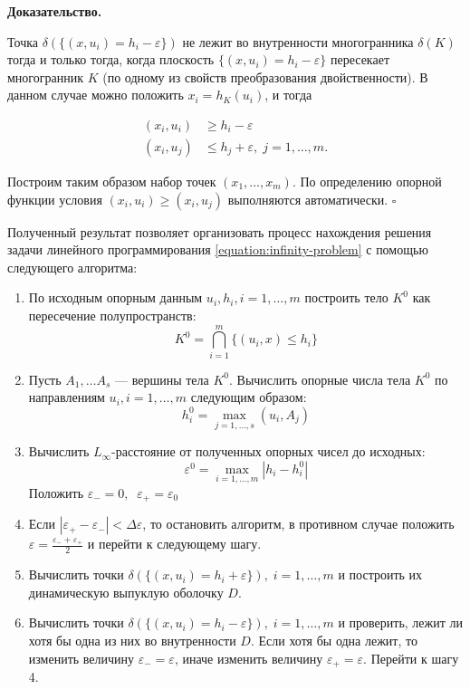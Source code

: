 \documentclass[a4paper, 10pt]{article}
\theoremstyle{definition}
\theoremstyle{plain}
\theoremstyle{plain}
\begin{document}
\textbf{Доказательство.}

Точка $\delta(\{(x, u_{i}) = h_{i} - \varepsilon\})$ не лежит во внутренности
многогранника $\delta(K)$ тогда и только тогда, когда плоскость
$\{(x, u_{i}) = h_{i} - \varepsilon\}$ пересекает многогранник $K$ (по
одному из свойств преобразования двойственности). В данном случае можно положить
$ x_{i} = h_{K}(u_{i}) $, и тогда 

\begin{align*}
 (x_{i}, u_{i}) & \geq h_{i} - \varepsilon \\
 (x_{i}, u_{j}) & \leq h_{j} + \varepsilon, \; j = 1, \ldots, m.
\end{align*}

Построим таким образом набор точек $(x_{1}, \ldots, x_{m})$. По определению
опорной функции условия $(x_{i}, u_{i}) \geq (x_{i}, u_{j})$ выполняются
автоматически.
$\square$

Полученный результат позволяет организовать процесс нахождения решения задачи
линейного программирования \ref{equation:infinity-problem} с помощью
следующего алгоритма:

\begin{enumerate}
 \item По исходным опорным данным $u_{i}, h_{i}, i = 1, \ldots, m$
 построить тело $K^{0}$ как пересечение полупространств:
 \begin{equation*}
 \label{equation:naive-body}
  K^{0} = \bigcap \limits_{i = 1}^{m} \{(u_{i}, x) \leq h_{i}\}
 \end{equation*}
 \item Пусть $A_{1}, \ldots A_{s}$ --- вершины тела $K^{0}$. Вычислить опорные
 числа тела $K^{0}$ по направлениям $u_{i}, i = 1, \ldots, m$ следующим образом:
 \begin{equation*}
  h^{0}_{i} = \max \limits_{j = 1, \ldots, s} (u_{i}, A_{j})
 \end{equation*}
 \item Вычислить $L_{\infty}$-расстояние от полученных опорных чисел до
 исходных:
 \begin{equation*}
  \varepsilon^{0} = \max \limits_{i = 1, \ldots, m} |h_{i} - h^{0}_{i}|
 \end{equation*}
 Положить $\varepsilon_{-} = 0, \;\; \varepsilon_{+} = \varepsilon_{0}$
 \item Если $|\varepsilon_{+} - \varepsilon_{-}| < \Delta \varepsilon$, то
 остановить алгоритм, в противном случае положить
 $\varepsilon = \frac{\varepsilon_{-} + \varepsilon_{+}}{2}$ и перейти к
 следующему шагу.
 \item Вычислить точки
 $\delta(\{(x, u_{i}) = h_{i} + \varepsilon\}), \; i = 1, \ldots, m$ и построить
 их динамическую выпуклую оболочку $D$.
 \item Вычислить точки
 $\delta(\{(x, u_{i}) = h_{i} - \varepsilon\}), \; i = 1, \ldots, m$ и
 проверить, лежит ли хотя бы одна из них во внутренности $D$. Если хотя бы одна
 лежит, то изменить величину $\varepsilon_{-} = \varepsilon$, иначе изменить
 величину $\varepsilon_{+} = \varepsilon$. Перейти к шагу 4.
\end{enumerate}
\end{document}
